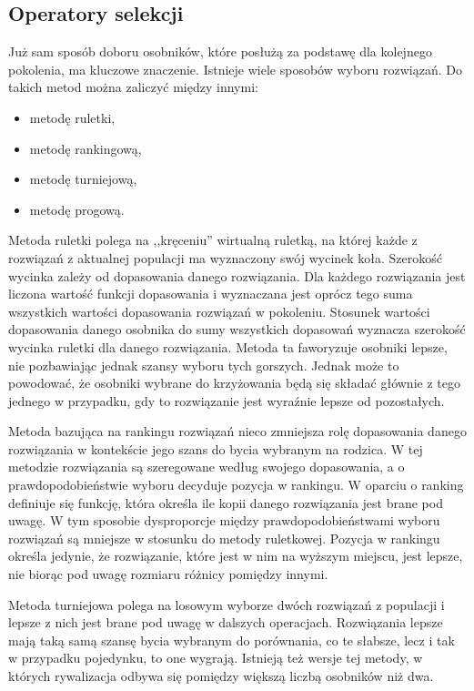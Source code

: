 \subsection{Operatory selekcji}
Już sam sposób doboru osobników, które posłużą za podstawę dla kolejnego pokolenia, ma kluczowe znaczenie. Istnieje wiele sposobów wyboru rozwiązań. Do takich metod można zaliczyć między innymi:
\begin{itemize}
\item metodę ruletki,
\item metodę rankingową,
\item metodę turniejową,
\item metodę progową.
\end{itemize}

Metoda ruletki polega na ,,kręceniu'' wirtualną ruletką, na której każde z rozwiązań z aktualnej populacji ma wyznaczony swój wycinek koła. Szerokość wycinka zależy od dopasowania danego rozwiązania. Dla każdego rozwiązania jest liczona wartość funkcji dopasowania i wyznaczana jest oprócz tego suma wszystkich wartości dopasowania rozwiązań w pokoleniu. Stosunek wartości dopasowania danego osobnika do sumy wszystkich dopasowań wyznacza szerokość wycinka ruletki dla danego rozwiązania. Metoda ta faworyzuje osobniki lepsze, nie pozbawiając jednak szansy wyboru tych gorszych. Jednak może to powodować, że osobniki wybrane do krzyżowania będą się składać głównie z tego jednego w przypadku, gdy to rozwiązanie jest wyraźnie lepsze od pozostałych.

Metoda bazująca na rankingu rozwiązań nieco zmniejsza rolę dopasowania danego rozwiązania w kontekście jego szans do bycia wybranym na rodzica. W tej metodzie rozwiązania są szeregowane według swojego dopasowania, a o prawdopodobieństwie wyboru decyduje pozycja w rankingu. W oparciu o ranking definiuje się funkcję, która określa ile kopii danego rozwiązania jest brane pod uwagę. W tym sposobie dysproporcje między prawdopodobieństwami wyboru rozwiązań są mniejsze w stosunku do metody ruletkowej. Pozycja w rankingu określa jedynie, że rozwiązanie, które jest w nim na wyższym miejscu, jest lepsze, nie biorąc pod uwagę rozmiaru różnicy pomiędzy innymi.

Metoda turniejowa polega na losowym wyborze dwóch rozwiązań z populacji i lepsze z nich jest brane pod uwagę w dalszych operacjach. Rozwiązania lepsze mają taką samą szansę bycia wybranym do porównania, co te słabsze, lecz i tak w przypadku pojedynku, to one wygrają. Istnieją też wersje tej metody, w których rywalizacja odbywa się pomiędzy większą liczbą osobników niż dwa.

